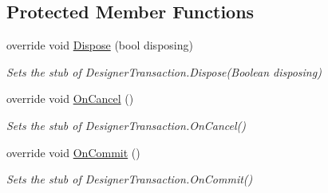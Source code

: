 \subsection*{Protected Member Functions}
\begin{DoxyCompactItemize}
\item 
override void \hyperlink{class_system_1_1_component_model_1_1_design_1_1_fakes_1_1_stub_designer_transaction_a4e1f522328c8c08348eaa7c2d7e449f9}{Dispose} (bool disposing)
\begin{DoxyCompactList}\small\item\em Sets the stub of Designer\-Transaction.\-Dispose(\-Boolean disposing)\end{DoxyCompactList}\item 
override void \hyperlink{class_system_1_1_component_model_1_1_design_1_1_fakes_1_1_stub_designer_transaction_a3dd968ffacc1cfa2359950be5e35d565}{On\-Cancel} ()
\begin{DoxyCompactList}\small\item\em Sets the stub of Designer\-Transaction.\-On\-Cancel()\end{DoxyCompactList}\item 
override void \hyperlink{class_system_1_1_component_model_1_1_design_1_1_fakes_1_1_stub_designer_transaction_a4e0932ba545d1db86ab0899901261b8e}{On\-Commit} ()
\begin{DoxyCompactList}\small\item\em Sets the stub of Designer\-Transaction.\-On\-Commit()\end{DoxyCompactList}\end{DoxyCompactItemize}
